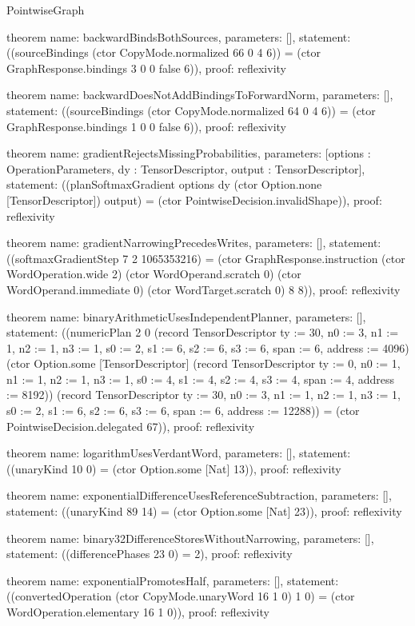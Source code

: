 \begin{lexlean}{PointwiseGraph}
\begin{semanticmodule}
theorem{
  name: backwardBindsBothSources,
  parameters: [],
  statement: ((sourceBindings (ctor CopyMode.normalized 66 0 4 6)) = (ctor GraphResponse.bindings 3 0 0 false 6)),
  proof: reflexivity{}
}

theorem{
  name: backwardDoesNotAddBindingsToForwardNorm,
  parameters: [],
  statement: ((sourceBindings (ctor CopyMode.normalized 64 0 4 6)) = (ctor GraphResponse.bindings 1 0 0 false 6)),
  proof: reflexivity{}
}

theorem{
  name: gradientRejectsMissingProbabilities,
  parameters: [options : OperationParameters, dy : TensorDescriptor, output : TensorDescriptor],
  statement: ((planSoftmaxGradient options dy (ctor Option.none [TensorDescriptor]) output) = (ctor PointwiseDecision.invalidShape)),
  proof: reflexivity{}
}

theorem{
  name: gradientNarrowingPrecedesWrites,
  parameters: [],
  statement: ((softmaxGradientStep 7 2 1065353216) = (ctor GraphResponse.instruction (ctor WordOperation.wide 2) (ctor WordOperand.scratch 0) (ctor WordOperand.immediate 0) (ctor WordTarget.scratch 0) 8 8)),
  proof: reflexivity{}
}

theorem{
  name: binaryArithmeticUsesIndependentPlanner,
  parameters: [],
  statement: ((numericPlan 2 0 (record TensorDescriptor {ty := 30, n0 := 3, n1 := 1, n2 := 1, n3 := 1, s0 := 2, s1 := 6, s2 := 6, s3 := 6, span := 6, address := 4096}) (ctor Option.some [TensorDescriptor] (record TensorDescriptor {ty := 0, n0 := 1, n1 := 1, n2 := 1, n3 := 1, s0 := 4, s1 := 4, s2 := 4, s3 := 4, span := 4, address := 8192})) (record TensorDescriptor {ty := 30, n0 := 3, n1 := 1, n2 := 1, n3 := 1, s0 := 2, s1 := 6, s2 := 6, s3 := 6, span := 6, address := 12288})) = (ctor PointwiseDecision.delegated 67)),
  proof: reflexivity{}
}

theorem{
  name: logarithmUsesVerdantWord,
  parameters: [],
  statement: ((unaryKind 10 0) = (ctor Option.some [Nat] 13)),
  proof: reflexivity{}
}

theorem{
  name: exponentialDifferenceUsesReferenceSubtraction,
  parameters: [],
  statement: ((unaryKind 89 14) = (ctor Option.some [Nat] 23)),
  proof: reflexivity{}
}

theorem{
  name: binary32DifferenceStoresWithoutNarrowing,
  parameters: [],
  statement: ((differencePhases 23 0) = 2),
  proof: reflexivity{}
}

theorem{
  name: exponentialPromotesHalf,
  parameters: [],
  statement: ((convertedOperation (ctor CopyMode.unaryWord 16 1 0) 1 0) = (ctor WordOperation.elementary 16 1 0)),
  proof: reflexivity{}
}


\end{semanticmodule}
\end{lexlean}
